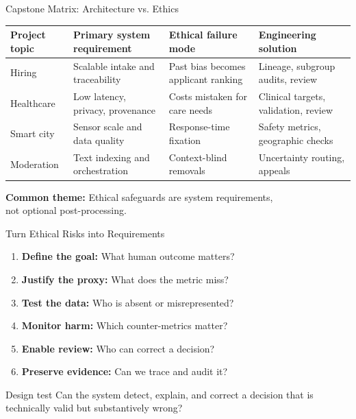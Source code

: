 \documentclass[aspectratio=43,10pt]{beamer}
\begin{document}
\begin{frame}{Capstone Matrix: Architecture vs. Ethics}
\centering
\fontsize{9}{8.8}\selectfont
\renewcommand{\arraystretch}{1.28}
\begin{tabular}{p{1.7cm}p{2.45cm}p{2.45cm}p{2.9cm}}
\toprule
\textbf{Project topic} & \textbf{Primary system requirement} &
\textbf{Ethical failure mode} & \textbf{Engineering solution}\\
\midrule
Hiring & Scalable intake and traceability &
Past bias becomes applicant ranking &
Lineage, subgroup audits, review\\
\addlinespace
Healthcare & Low latency, privacy, provenance &
Costs mistaken for care needs &
Clinical targets, validation, review\\
\addlinespace
Smart city & Sensor scale and data quality &
Response-time fixation &
Safety metrics, geographic checks\\
\addlinespace
Moderation & Text indexing and orchestration &
Context-blind removals &
Uncertainty routing, appeals\\
\bottomrule
\end{tabular}

\medskip
\textbf{Common theme:} Ethical safeguards are system requirements,\\
not optional post-processing.
\end{frame}

\begin{frame}{Turn Ethical Risks into Requirements}
\begin{enumerate}
  \item \textbf{Define the goal:} What human outcome matters?
  \item \textbf{Justify the proxy:} What does the metric miss?
  \item \textbf{Test the data:} Who is absent or misrepresented?
  \item \textbf{Monitor harm:} Which counter-metrics matter?
  \item \textbf{Enable review:} Who can correct a decision?
  \item \textbf{Preserve evidence:} Can we trace and audit it?
\end{enumerate}

\medskip
\begin{block}{Design test}
Can the system detect, explain, and correct a decision
that is technically valid but substantively wrong?
\end{block}
\end{frame}
\end{document}
